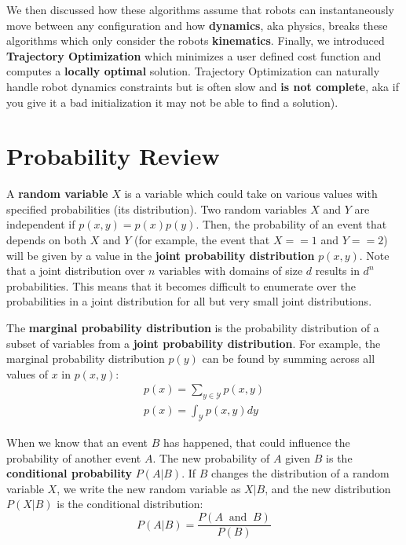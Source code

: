 \documentclass[11pt]{article}
\begin{document}
We then discussed how these algorithms assume that robots can instantaneously move between any configuration and how \textbf{dynamics}, aka physics, breaks these algorithms which only consider the robots \textbf{kinematics}. Finally, we introduced \textbf{Trajectory Optimization} which minimizes a user defined cost function and computes a \textbf{locally optimal} solution. Trajectory Optimization can naturally handle robot dynamics constraints but is often slow and  \textbf{is not complete}, aka if you give it a bad initialization it may not be able to find a solution).
\section{Probability Review}
A {\bf{random variable}} $X$ is a variable which could take on various values with specified probabilities (its distribution). Two random variables $X$ and $Y$ are independent if $p(x, y) = p(x)p(y)$. Then, the probability of an event that depends on both $X$ and $Y$ (for example, the event that $X == 1$ and $Y == 2$) will be given by a value in the {\bf{joint probability distribution}} $p(x, y)$. Note that a joint distribution over $n$ variables with domains of size $d$ results in $d^n$ probabilities. This means that it becomes difficult to enumerate over the probabilities in a joint distribution for all but very small joint distributions.

\noindent The {\bf{marginal probability distribution}} is the probability distribution of a subset of variables from a {\bf{joint probability distribution}}. For example, the marginal probability distribution $p(y)$ can be found by summing across all values of $x$ in $p(x, y)$:
\begin{align*}
p(x) = \sum_{y \in \mathcal{Y}} p(x, y) \\
p(x) = \int_{\mathcal{Y}} p(x,y) dy
\end{align*}

\noindent When we know that an event $B$ has happened, that could influence the probability of another event $A$. The new probability of $A$ given $B$ is the {\bf{conditional probability}} $P(A|B)$. If $B$ changes the distribution of a random variable $X$, we write the new random variable as $X|B$, and the new distribution $P(X|B)$ is the conditional distribution:
$$ P(A | B) = \frac{P(A \;\; \text{and} \;\; B)}{P(B)}$$
\end{document}
